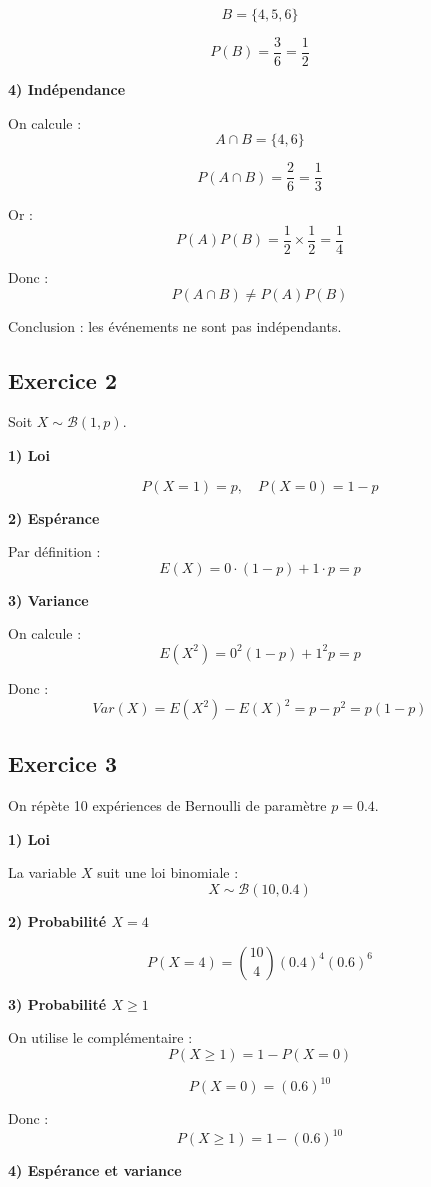 \documentclass[11pt,a4paper]{article}
\begin{document}
\[
B = \{4,5,6\}
\]

\[
P(B) = \frac{3}{6} = \frac{1}{2}
\]

\textbf{4) Indépendance}

On calcule :
\[
A \cap B = \{4,6\}
\]

\[
P(A \cap B) = \frac{2}{6} = \frac{1}{3}
\]

Or :
\[
P(A)P(B) = \frac{1}{2} \times \frac{1}{2} = \frac{1}{4}
\]

Donc :
\[
P(A \cap B) \neq P(A)P(B)
\]

Conclusion : les événements ne sont pas indépendants.

\subsection*{Exercice 2}

Soit $X \sim \mathcal{B}(1,p)$.

\textbf{1) Loi}

\[
P(X=1)=p,\quad P(X=0)=1-p
\]

\textbf{2) Espérance}

Par définition :
\[
E(X)=0 \cdot (1-p) + 1 \cdot p = p
\]

\textbf{3) Variance}

On calcule :
\[
E(X^2)=0^2(1-p)+1^2 p = p
\]

Donc :
\[
Var(X)=E(X^2)-E(X)^2 = p - p^2 = p(1-p)
\]

\subsection*{Exercice 3}

On répète 10 expériences de Bernoulli de paramètre $p=0.4$.

\textbf{1) Loi}

La variable $X$ suit une loi binomiale :
\[
X \sim \mathcal{B}(10,0.4)
\]

\textbf{2) Probabilité $X=4$}

\[
P(X=4)=\binom{10}{4}(0.4)^4(0.6)^6
\]

\textbf{3) Probabilité $X \geq 1$}

On utilise le complémentaire :
\[
P(X \geq 1)=1-P(X=0)
\]

\[
P(X=0)=(0.6)^{10}
\]

Donc :
\[
P(X \geq 1)=1-(0.6)^{10}
\]

\textbf{4) Espérance et variance}
\end{document}
